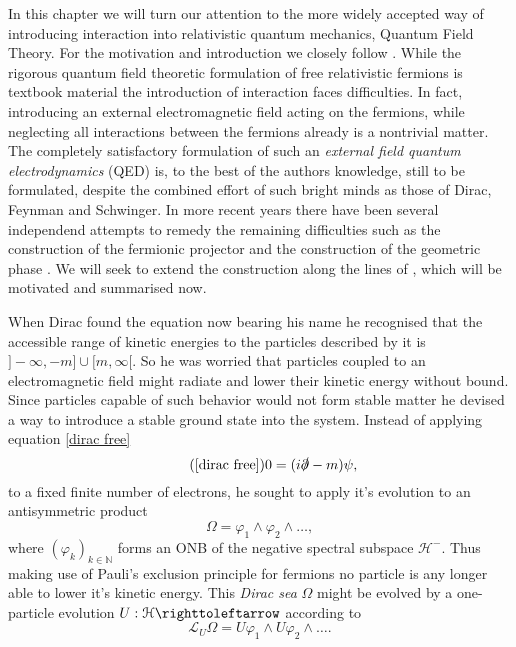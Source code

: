 \documentclass[b5paper,draft,openbib,12pt]{memoir}
\begin{document}
In this chapter we will turn our attention to the 
more widely accepted way of 
introducing interaction into relativistic quantum 
mechanics, Quantum Field Theory. For the motivation and 
introduction we closely follow \cite{deckert2016perspective}.
While the rigorous quantum field theoretic formulation of free 
relativistic fermions is textbook material
\cite{derezinski2013mathematics} the introduction of interaction faces 
difficulties. In fact, introducing an external electromagnetic field
acting on the fermions, 
while neglecting all interactions between the 
fermions already is a nontrivial 
matter. The completely satisfactory formulation of such an 
\emph{external field quantum electrodynamics} (QED) is, 
to the best of the authors 
knowledge, still to be formulated, despite the combined 
effort of such bright 
minds as those of Dirac\cite{dirac1934theorie}, 
 Feynman\cite{feynman1949theory} 
and Schwinger\cite{schwinger1951gauge}. 
In more recent years there have been several independend attempts 
to remedy the remaining difficulties such as the construction 
of the fermionic projector \cite{finster2016fermionic} 
and the construction of the geometric phase \cite{mickelsson2014phase}.
We will seek to extend the construction along the lines of 
\cite{ivp0,ivp1,ivp2}, which will be motivated and summarised
now. 

When Dirac found the equation now bearing his name he 
recognised that the accessible range of kinetic energies 
to the particles described by it is 
\(]-\infty, -m]\cup[m, \infty[\). So he was worried that 
particles coupled to an electromagnetic field might radiate 
and lower their kinetic energy without bound. Since particles 
capable of such behavior would not form stable matter he 
devised a way to introduce a stable ground state into the 
system. Instead of applying equation \eqref{dirac free}
\begin{equation}\tag{\ref{dirac free}}
  0= (i\slashed{\partial}-m) \psi,
\end{equation}
to a fixed finite number of electrons, he sought to apply 
it's evolution to an antisymmetric product 
\begin{equation}\label{infinite wedge}
  \Omega= \varphi_1\wedge \varphi_2\wedge \dots,
\end{equation}
where \((\varphi_k)_{k\in\mathbb{N}}\) forms an ONB of the negative spectral 
subspace \(\mathcal{H}^-\). Thus making use of 
Pauli's exclusion principle for 
fermions no particle is any longer able to lower it's kinetic 
energy.  This \emph{Dirac sea} \(\Omega\) might be evolved 
by a one-particle evolution \(U:\mathcal{H}\righttoleftarrow\)
according to 
\begin{equation}
  \mathcal{L}_U \Omega= U\varphi_1\wedge U \varphi_2\wedge \dots.
\end{equation}
\end{document}
